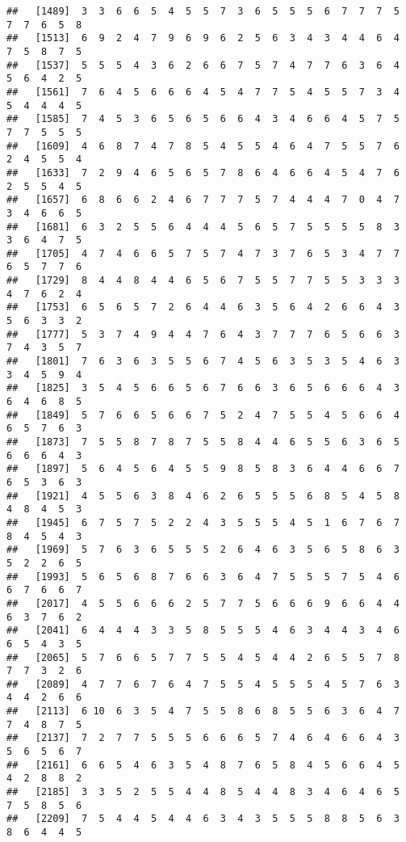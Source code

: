 \documentclass[
]{book}
\begin{document}
\begin{verbatim}
##   [1489]  3  3  6  6  5  4  5  5  7  3  6  5  5  5  6  7  7  7  5  7  7  6  5  8
##   [1513]  6  9  2  4  7  9  6  9  6  2  5  6  3  4  3  4  4  6  4  7  5  8  7  5
##   [1537]  5  5  5  4  3  6  2  6  6  7  5  7  4  7  7  6  3  6  4  5  6  4  2  5
##   [1561]  7  6  4  5  6  6  6  4  5  4  7  7  5  4  5  5  7  3  4  5  4  4  4  5
##   [1585]  7  4  5  3  6  5  6  5  6  6  4  3  4  6  6  4  5  7  5  7  7  5  5  5
##   [1609]  4  6  8  7  4  7  8  5  4  5  5  4  6  4  7  5  5  7  6  2  4  5  5  4
##   [1633]  7  2  9  4  6  5  6  5  7  8  6  4  6  6  4  5  4  7  6  2  5  5  4  5
##   [1657]  6  8  6  6  2  4  6  7  7  7  5  7  4  4  4  7  0  4  7  3  4  6  6  5
##   [1681]  6  3  2  5  5  6  4  4  4  5  6  5  7  5  5  5  5  8  3  3  6  4  7  5
##   [1705]  4  7  4  6  6  5  7  5  7  4  7  3  7  6  5  3  4  7  7  6  5  7  7  6
##   [1729]  8  4  4  8  4  4  6  5  6  7  5  5  7  7  5  5  3  3  3  4  7  6  2  4
##   [1753]  6  5  6  5  7  2  6  4  4  6  3  5  6  4  2  6  6  4  3  5  6  3  3  2
##   [1777]  5  3  7  4  9  4  4  7  6  4  3  7  7  7  6  5  6  6  3  7  4  3  5  7
##   [1801]  7  6  3  6  3  5  5  6  7  4  5  6  3  5  3  5  4  6  3  3  4  5  9  4
##   [1825]  3  5  4  5  6  6  5  6  7  6  6  3  6  5  6  6  6  4  3  6  4  6  8  5
##   [1849]  5  7  6  6  5  6  6  7  5  2  4  7  5  5  4  5  6  6  4  6  5  7  6  3
##   [1873]  7  5  5  8  7  8  7  5  5  8  4  4  6  5  5  6  3  6  5  6  6  6  4  3
##   [1897]  5  6  4  5  6  4  5  5  9  8  5  8  3  6  4  4  6  6  7  6  5  3  6  3
##   [1921]  4  5  5  6  3  8  4  6  2  6  5  5  5  6  8  5  4  5  8  4  8  4  5  3
##   [1945]  6  7  5  7  5  2  2  4  3  5  5  5  4  5  1  6  7  6  7  8  4  5  4  3
##   [1969]  5  7  6  3  6  5  5  5  2  6  4  6  3  5  6  5  8  6  3  5  2  2  6  5
##   [1993]  5  6  5  6  8  7  6  6  3  6  4  7  5  5  5  7  5  4  6  6  7  6  6  7
##   [2017]  4  5  5  6  6  6  2  5  7  7  5  6  6  6  9  6  6  4  4  6  3  7  6  2
##   [2041]  6  4  4  4  3  3  5  8  5  5  5  4  6  3  4  4  3  4  6  6  5  4  3  5
##   [2065]  5  7  6  6  5  7  7  5  5  4  5  4  4  2  6  5  5  7  8  7  7  3  2  6
##   [2089]  4  7  7  6  7  6  4  7  5  5  4  5  5  5  4  5  7  6  3  4  4  2  6  6
##   [2113]  6 10  6  3  5  4  7  5  5  8  6  8  5  5  6  3  6  4  7  7  4  8  7  5
##   [2137]  7  2  7  7  5  5  5  6  6  6  5  7  4  6  4  6  6  4  3  5  6  5  6  7
##   [2161]  6  6  5  4  6  3  5  4  8  7  6  5  8  4  5  6  6  4  5  4  2  8  8  2
##   [2185]  3  3  5  2  5  5  4  4  8  5  4  4  8  3  4  6  4  6  5  7  5  8  5  6
##   [2209]  7  5  4  4  5  4  4  6  3  4  3  5  5  5  8  8  5  6  3  8  6  4  4  5

\end{verbatim}
\end{document}

